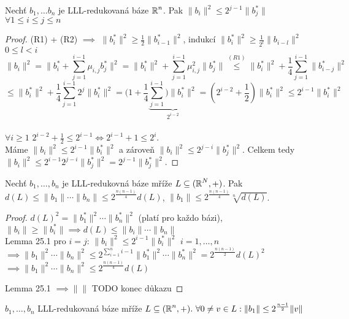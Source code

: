 \begin{lemma}[25.1 Ve skriptech] 
Nechť $b_1,\ldots b_n$ je LLL-redukovaná báze $\operatorname{\mathbb{R}}^n$. Pak $\|b_i\|^2\leq 2^{j-1}\|b_j^*\|$ $\forall 1\leq i \leq j \leq n$
\end{lemma}

\begin{proof}
(R1) + (R2) $\implies$ $\|b_i^*\|^2\geq \frac{1}{2}\|b_{i-1}^*\|^2$, indukcí $\|b_i^*\|^2\geq \frac{1}{2^l}\|b_{i-l}\|^2$ $0\leq l <i$\\
$$\|b_i\|^2=\|b_i^*+\sum_{j=1}^{i-1} \mu_{i,j}b_j^*\|^2=\|b_i^*\|^2+\sum_{j=1}^{i-1}\mu_{i,j}^2\|b_j^*\|\overset{(R1)}{\leq}\|b_i^*\|^2+\frac{1}{4}\sum_{j=1}^{i-1}\|b_{i-j}^*\|^2$$
$$\leq\|b_i^*\|^2+\frac{1}{4}\sum_{j=1}^{i-1}2^j\|b_i^*\|^2=
(1+\frac{1}{4}\underbrace{\sum_{j=1}^{i-1})\|b_i^*\|^2}_{2^{i-2}}=
(2^{i-2}+\frac{1}{2})\|b_i^*\|^2\leq 2^{i-1}\|b_i^*\|^2$$\\

$\forall i\geq 1$ $2^{i-2}+\frac{1}{2}\leq 2^{i-1}\iff 2^{i-1}+1\leq 2^i$.\\

Máme $\|b_i\|^2\leq 2^{i-1}\|b_i^*\|^2$ a zároveň $\|b_i\|^2\leq 2^{j-i}\|b_j^*\|^2$. Celkem tedy $\|b_i\|^2\leq 2^{i-1}2^{j-i}\|b_j^*\|^2=2^{j-1}\|b_j^*\|^2$.
\end{proof} 


\begin{claim}[25.2] Nechť $b_1,\ldots,b_n$ je LLL-redukovná báze mříže $L\subseteq (\operatorname{\mathbb{R}}^N,+)$. Pak $d(L)\leq\|b_1\|\cdots\|b_n\| \leq 2^{\frac{n(n-1)}{4}}d(L)$, $\|b_1\|\leq2^{\frac{n(n-1)}{4}}\sqrt[n]{d(L)}$.
\end{claim}

\begin{proof}
$d(L)^2=\|b_1^*\|^2\cdots\|b_n^*\|^2$ (platí pro každo bázi), $\|b_i\|\geq \|b_i^*\|\implies d(L)\leq \|b_i\|\cdots\|b_n\|$\\
Lemma 25.1 pro $i=j$: $\|b_i\|^2\leq 2^{i-1}\|b_i^*\|^2$ $i=1,\ldots, n$\\
$\implies \|b_1\|^2\cdots\|b_n\|^2\leq 2^{\sum_{i=1}^{n}i-1}\|b_1^*\|^2\cdots\|b_n^*\|^2=2^{\frac{n(n-1)}{2}}d(L)^2$\\
$\implies \|b_1\|^2\cdots\|b_n\|^2\leq 2^{\frac{n(n-1)}{4}}d(L)$

Lemma 25.1 $\implies \|\|$
TODO konec důkazu
\end{proof}

\begin{claim}[25.3]
$b_1,\ldots,b_n$ LLL-redukovaná báze mříže $L\subseteq(\operatorname{\mathbb{R}}^n,+).\ \forall 0\neq v\in L: \|b_1\|\leq 2^{\frac{n-1}{2}}\|v\|$
\end{claim}

